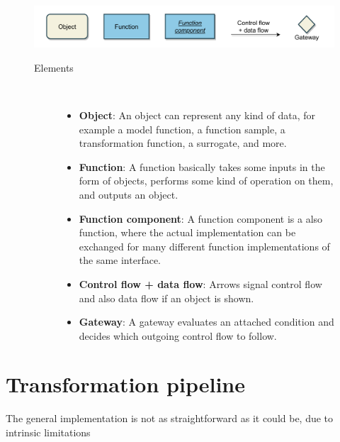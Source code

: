 \documentclass[
  a4paper,  %
  twoside,  %
  bibliography=totoc,
  headsepline,
  cleardoublepage=empty,
  parskip=half,
  draft=false
]{scrbook}
\begin{document}
\begin{mdframed}[style=style,frametitle={Notation}]
\begin{figure}[H]

\includegraphics[width=\textwidth]{graphics/definitions.pdf}
\vspace{-7.5mm}

\delimit

\vspace{3.5mm}

\begin{description}
\item[Elements] {~ \begin{itemize}[\null]
\item \textbf{Object}: An object can represent any kind of data, for example a model function, a function sample, a transformation function, a surrogate, and more.
\item \textbf{Function}: A function basically takes some inputs in the form of objects, performs some kind of operation on them, and outputs an object.
\item \textbf{Function component}: A function component is a also function, where the actual implementation can be exchanged for many different function implementations of the same interface.
\item \textbf{Control flow + data flow}: Arrows signal control flow and also data flow if an object is shown.
\item \textbf{Gateway}: A gateway evaluates an attached condition and decides which outgoing control flow to follow.
\end{itemize}}
\end{description}

\delimit

\label{fig:defs}
\end{figure}
\end{mdframed}

\newpage
\section{Transformation pipeline}
\label{sec:tp}

The general implementation is not as straightforward as it could be, due to intrinsic limitations
\end{document}

